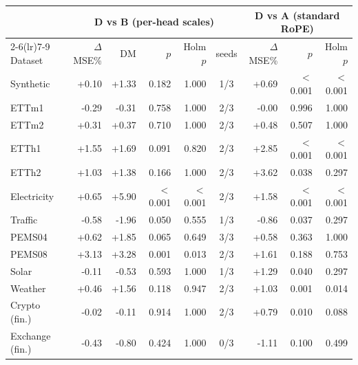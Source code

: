 \begin{tabular}{lrrrrcrrr}
\toprule
 & \multicolumn{5}{c}{D vs B (per-head scales)} & \multicolumn{3}{c}{D vs A (standard RoPE)} \\
\cmidrule(lr){2-6}\cmidrule(lr){7-9}
Dataset & $\Delta$MSE\% & DM & $p$ & Holm $p$ & seeds & $\Delta$MSE\% & $p$ & Holm $p$ \\
\midrule
Synthetic & +0.10 & +1.33 & 0.182 & 1.000 & 1/3 & +0.69 & $<$0.001 & $<$0.001 \\
ETTm1 & -0.29 & -0.31 & 0.758 & 1.000 & 2/3 & -0.00 & 0.996 & 1.000 \\
ETTm2 & +0.31 & +0.37 & 0.710 & 1.000 & 2/3 & +0.48 & 0.507 & 1.000 \\
ETTh1 & +1.55 & +1.69 & 0.091 & 0.820 & 2/3 & +2.85 & $<$0.001 & $<$0.001 \\
ETTh2 & +1.03 & +1.38 & 0.166 & 1.000 & 2/3 & +3.62 & 0.038 & 0.297 \\
Electricity & +0.65 & +5.90 & $<$0.001 & $<$0.001 & 2/3 & +1.58 & $<$0.001 & $<$0.001 \\
Traffic & -0.58 & -1.96 & 0.050 & 0.555 & 1/3 & -0.86 & 0.037 & 0.297 \\
PEMS04 & +0.62 & +1.85 & 0.065 & 0.649 & 3/3 & +0.58 & 0.363 & 1.000 \\
PEMS08 & +3.13 & +3.28 & 0.001 & 0.013 & 2/3 & +1.61 & 0.188 & 0.753 \\
Solar & -0.11 & -0.53 & 0.593 & 1.000 & 1/3 & +1.29 & 0.040 & 0.297 \\
Weather & +0.46 & +1.56 & 0.118 & 0.947 & 2/3 & +1.03 & 0.001 & 0.014 \\
Crypto (fin.) & -0.02 & -0.11 & 0.914 & 1.000 & 2/3 & +0.79 & 0.010 & 0.088 \\
Exchange (fin.) & -0.43 & -0.80 & 0.424 & 1.000 & 0/3 & -1.11 & 0.100 & 0.499 \\
\bottomrule
\end{tabular}
